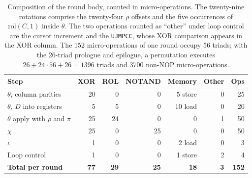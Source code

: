 \documentclass[journal=tches,submission]{iacrtrans}
\newcommand{\code}[1]{\texttt{#1}}
\begin{document}
\begin{table}[!ht]
\centering
\small
\begin{tabular}{@{}lrrrrrr@{}}
\toprule
\textbf{Step} & \textbf{XOR} & \textbf{ROL} & \textbf{NOTAND} & \textbf{Memory} & \textbf{Other} & \textbf{Ops} \\
\midrule
$\theta$, column parities        & 20 &  0 &  0 & 5 store & 0 & 25 \\
$\theta$, $D$ into registers     &  5 &  5 &  0 & 10 load & 0 & 20 \\
$\theta$ apply with $\rho$ and $\pi$ & 25 & 24 &  0 & 0 & 1 & 50 \\
$\chi$                           & 25 &  0 & 25 & 0 & 0 & 50 \\
$\iota$                          &  1 &  0 &  0 & 2 load & 0 &  3 \\
Loop control                     &  1 &  0 &  0 & 1 store & 2 &  4 \\
\midrule
\textbf{Total per round}         & \textbf{77} & \textbf{29} & \textbf{25} & \textbf{18} & \textbf{3} & \textbf{152} \\
\bottomrule
\end{tabular}
\caption{Composition of the round body, counted in micro-operations. The
twenty-nine rotations comprise the twenty-four $\rho$ offsets and the five
occurrences of $\mathrm{rol}(C,1)$ inside $\theta$. The two operations counted
as ``other'' under loop control are the cursor increment and the \code{UJMPCC},
whose XOR comparison appears in the XOR column. The 152 micro-operations of one
round occupy 56 triads; with the 26-triad prologue and epilogue, a permutation
executes $26+24\cdot56+26=1396$ triads and 3700 non-NOP micro-operations.}
\label{tab:roundmix}
\end{table}
\end{document}
